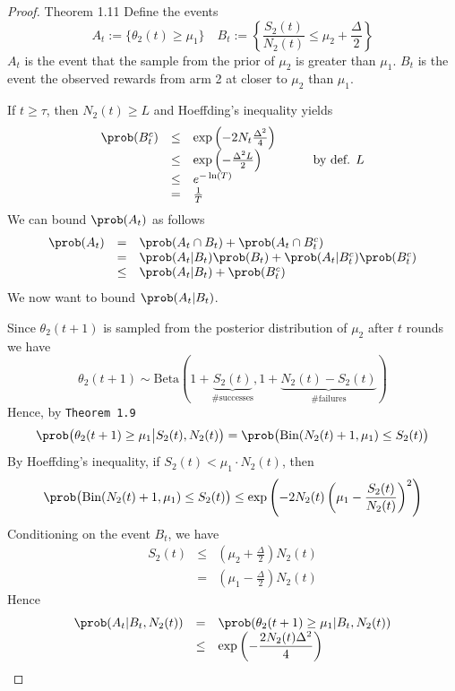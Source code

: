 \documentclass[11pt,a4paper]{article}
\begin{document}
  \begin{proof}{Theorem 1.11}
    Define the events
    \[ A_t:=\{\theta_2(t)\geq\mu_1\}\quad B_t:=\left\{\dfrac{S_2(t)}{N_2(t)}\leq\mu_2+\frac\Delta2\right\} \]
    $A_t$ is the event that the sample from the prior of $\mu_2$ is greater than $\mu_1$. $B_t$ is the event the observed rewards from arm 2 at closer to $\mu_2$ than $\mu_1$.
    \par If $t\geq\tau$, then $N_2(t)\geq L$ and Hoeffding's inequality yields
    \[\begin{array}{rclll}
      \prob(B_t^c)&\leq&\exp\left(-2N_t\frac{\Delta^2}4\right)&\quad&\\
      &\leq&\exp\left(-\frac{\Delta^2L}2\right)&&\text{by def. }L\\
      &\leq&e^{-\ln(T)}\\
      &=&\frac1T
    \end{array}\]
    We can bound $\prob(A_t)$ as follows
    \[\begin{array}{rcl}
      \prob(A_t)&=&\prob(A_t\cap B_t)+\prob(A_t\cap B_t^c)\\
      &=&\prob(A_t|B_t)\prob(B_t)+\prob(A_t|B_t^c)\prob(B_t^c)\\
      &\leq&\prob(A_t|B_t)+\prob(B_t^c)
    \end{array}\]
    We now want to bound $\prob(A_t|B_t)$.
    \par Since $\theta_2(t+1)$ is sampled from the posterior distribution of $\mu_2$ after $t$ rounds we have
    \[ \theta_2(t+1)\sim\text{Beta}\left(1+\underbrace{S_2(t)}_\text{\# successes},1+\underbrace{N_2(t)-S_2(t)}_\text{\# failures}\right) \]
    Hence, by \texttt{Theorem 1.9}
    \[ \prob\big(\theta_2(t+1)\geq\mu_1\big|S_2(t),N_2(t)\big)=\prob\big(\text{Bin}(N_2(t)+1,\mu_1)\leq S_2(t)\big) \]
    By Hoeffding's inequality, if $S_2(t)<\mu_1\cdot N_2(t)$, then
    \[ \prob\big(\text{Bin}(N_2(t)+1,\mu_1)\leq S_2(t)\big)\leq\exp\left(-2N_2(t)\left(\mu_1-\frac{S_2(t)}{N_2(t)}\right)^2\right) \]
    Conditioning on the event $B_t$, we have
    \[\begin{array}{rcl}
      S_2(t)&\leq&\left(\mu_2+\frac\Delta2\right)N_2(t)\\
      &=&\left(\mu_1-\frac\Delta2\right)N_2(t)
    \end{array}\]
    Hence
    \[\begin{array}{rcl}
      \prob(A_t|B_t,N_2(t))&=&\prob(\theta_2(t+1)\geq\mu_1|B_t,N_2(t))\\
      &\leq&\exp\left(-\dfrac{2N_2(t)\Delta^2}4\right)
    \end{array}\]

\end{proof}
\end{document}
